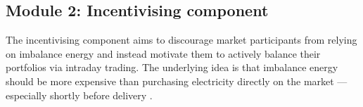 \documentclass[class=scrbook, crop=false]{standalone}
\begin{document}

 
 



\subsection{Module 2: Incentivising component}
\label{Section::Module_2}
The incentivising component aims to discourage market participants from relying on imbalance energy and instead motivate them to actively balance their portfolios via intraday trading. The underlying idea is that imbalance energy should be more expensive than purchasing electricity directly on the market — especially shortly before delivery \cite{kochPASSIVEBALANCINGINTRADAY2020a} .
\end{document}
